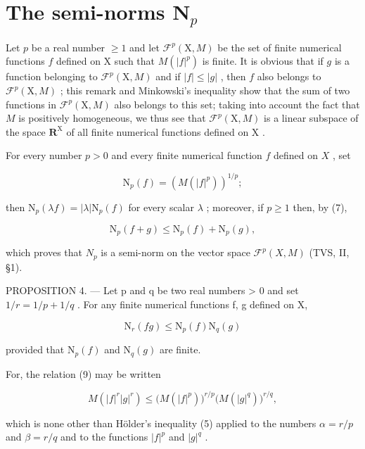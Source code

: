 \section{\texorpdfstring{The semi-norms \(\mathbf{N}_p\)}{The semi-norms N sub p}}

Let \(p\) be a real number \(\geqslant 1\) and let \(\mathcal{F}^p(\mathrm{X},M)\) be the set of finite numerical functions \(f\) defined on \(\mathrm{X}\) such that \(M(|f|^p)\) is finite. It is obvious that if \(g\) is a function belonging to \(\mathcal{F}^p(\mathrm{X},M)\) and if \(|f| \leqslant |g|\) , then \(f\) also belongs to \(\mathcal{F}^p(\mathrm{X},M)\) ; this remark and Minkowski's inequality show that the sum of two functions in \(\mathcal{F}^p(\mathrm{X},M)\) also belongs to this set; taking into account the fact that \(M\) is positively homogeneous, we thus see that \(\mathcal{F}^p(\mathrm{X},M)\) is a linear subspace of the space \(\mathbf{R}^{\mathrm{X}}\) of all finite numerical functions defined on \(\mathrm{X}\) .

For every number \(p > 0\) and every finite numerical function \(f\) defined on \(X\) , set

\[
\mathrm{N} _ {p} (f) = \left(M (| f | ^ {p})\right) ^ {1 / p};
\]

then \(\mathrm{N}_p(\lambda f) = |\lambda |\mathrm{N}_p(f)\) for every scalar \(\lambda\) ; moreover, if \(p \geqslant 1\) then, by (7),

\[
\mathrm{N} _ {p} (f + g) \leqslant \mathrm{N} _ {p} (f) + \mathrm{N} _ {p} (g),\tag{8}
\]

which proves that \(N_{p}\) is a semi-norm on the vector space \(\mathcal{F}^{p}(X,M)\) (TVS, II, §1).

PROPOSITION 4. --- Let p and q be two real numbers \textgreater{} 0 and set \(1/r = 1/p + 1/q\) . For any finite numerical functions f, g defined on X,

\[
\mathrm{N} _ {r} (f g) \leqslant \mathrm{N} _ {p} (f) \mathrm{N} _ {q} (g)\tag{9}
\]

provided that \(\mathrm{N}_p(f)\) and \(\mathrm{N}_q(g)\) are finite.

For, the relation (9) may be written

\[
M (| f | ^ {r} | g | ^ {r}) \leqslant \bigl (M (| f | ^ {p}) \bigr) ^ {r / p} \bigl (M (| g | ^ {q}) \bigr) ^ {r / q},
\]

which is none other than Hölder's inequality (5) applied to the numbers \(\alpha = r / p\) and \(\beta = r / q\) and to the functions \(|f|^p\) and \(|g|^q\) .

